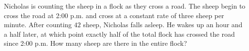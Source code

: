 Nicholas is counting the sheep in a flock as they cross a road. The sheep begin to cross the road at 2:00 p.m. and cross at a constant rate of three sheep per minute. After counting $42$ sheep, Nicholas falls asleep. He wakes up an hour and a half later, at which point exactly half of the total flock has crossed the road since 2:00 p.m. How many sheep are there in the entire flock?

